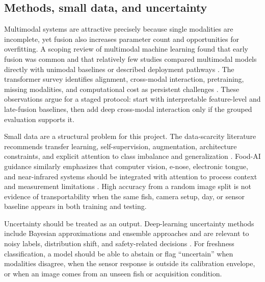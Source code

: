 \documentclass[11pt]{article}
\begin{document}
\subsection{Methods, small data, and uncertainty}

Multimodal systems are attractive precisely because single modalities are incomplete, yet fusion also increases parameter count and opportunities for overfitting. A scoping review of multimodal machine learning found that early fusion was common and that relatively few studies compared multimodal models directly with unimodal baselines or described deployment pathways \citep{Kline2022multimodal}. The transformer survey identifies alignment, cross-modal interaction, pretraining, missing modalities, and computational cost as persistent challenges \citep{Xu2023multimodal}. These observations argue for a staged protocol: start with interpretable feature-level and late-fusion baselines, then add deep cross-modal interaction only if the grouped evaluation supports it.

Small data are a structural problem for this project. The data-scarcity literature recommends transfer learning, self-supervision, augmentation, architecture constraints, and explicit attention to class imbalance and generalization \citep{Alzubaidi2023survey}. Food-AI guidance similarly emphasizes that computer vision, e-nose, electronic tongue, and near-infrared systems should be integrated with attention to process context and measurement limitations \citep{Mavani2022application,Zhu2021deep,Liakos2025machine}. High accuracy from a random image split is not evidence of transportability when the same fish, camera setup, day, or sensor baseline appears in both training and testing.

Uncertainty should be treated as an output. Deep-learning uncertainty methods include Bayesian approximations and ensemble approaches and are relevant to noisy labels, distribution shift, and safety-related decisions \citep{Abdar2021review}. For freshness classification, a model should be able to abstain or flag ``uncertain'' when modalities disagree, when the sensor response is outside its calibration envelope, or when an image comes from an unseen fish or acquisition condition.
\end{document}
